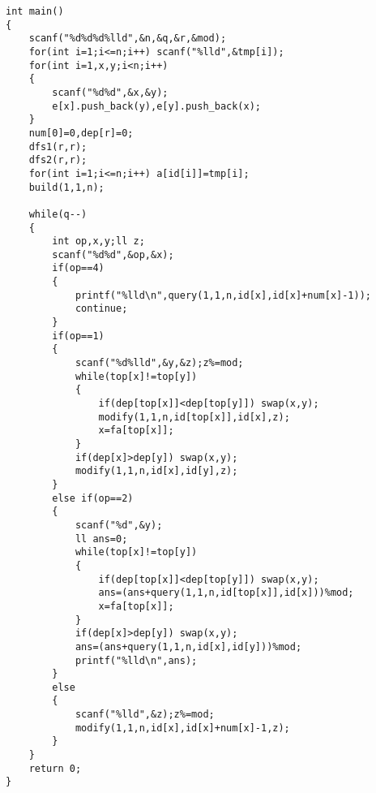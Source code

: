 \begin{lstlisting}
int main()
{
    scanf("%d%d%d%lld",&n,&q,&r,&mod);
    for(int i=1;i<=n;i++) scanf("%lld",&tmp[i]);
    for(int i=1,x,y;i<n;i++)
    {
        scanf("%d%d",&x,&y);
        e[x].push_back(y),e[y].push_back(x);
    }
    num[0]=0,dep[r]=0;
    dfs1(r,r);
    dfs2(r,r);
    for(int i=1;i<=n;i++) a[id[i]]=tmp[i];
    build(1,1,n);

    while(q--)
    {
        int op,x,y;ll z;
        scanf("%d%d",&op,&x);
        if(op==4)
        {
            printf("%lld\n",query(1,1,n,id[x],id[x]+num[x]-1));
            continue;
        }
        if(op==1)
        {
            scanf("%d%lld",&y,&z);z%=mod;
            while(top[x]!=top[y])
            {
                if(dep[top[x]]<dep[top[y]]) swap(x,y);
                modify(1,1,n,id[top[x]],id[x],z);
                x=fa[top[x]];
            }
            if(dep[x]>dep[y]) swap(x,y);
            modify(1,1,n,id[x],id[y],z);
        }
        else if(op==2)
        {
            scanf("%d",&y);
            ll ans=0;
            while(top[x]!=top[y])
            {
                if(dep[top[x]]<dep[top[y]]) swap(x,y);
                ans=(ans+query(1,1,n,id[top[x]],id[x]))%mod;
                x=fa[top[x]];
            }
            if(dep[x]>dep[y]) swap(x,y);
            ans=(ans+query(1,1,n,id[x],id[y]))%mod;
            printf("%lld\n",ans);
        }
        else
        {
            scanf("%lld",&z);z%=mod;
            modify(1,1,n,id[x],id[x]+num[x]-1,z);
        }
    }
    return 0;
}
\end{lstlisting}